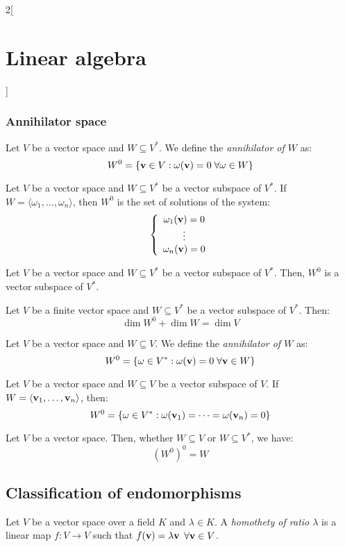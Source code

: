 \documentclass[../../../main.tex]{subfiles}
\begin{document}
\begin{multicols}{2}[\section{Linear algebra}]
  \subsubsection*{Annihilator space}
  \begin{definition}
    Let $V$ be a vector space and $W\subseteq V^*$. We define the \textit{annihilator of $W$} as:
    $$W^0=\{\vb{v}\in V:\omega(\vb{v})=0\;\forall\omega\in W\}$$
  \end{definition}
  \begin{lemma}
    Let $V$ be a vector space and $W\subseteq V^*$ be a vector subspace of $V^*$. If $W=\langle\omega_1,\ldots,\omega_n\rangle$, then $W^0$ is the set of solutions of the system:
    $$\left\{
      \begin{array}{c}
        \omega_1(\vb{v})=0 \\
        \vdots                    \\
        \omega_n(\vb{v})=0
      \end{array}
      \right.$$
  \end{lemma}
  \begin{lemma}
    Let $V$ be a vector space and $W\subseteq V^*$ be a vector subspace of $V^*$. Then, $W^0$ is a vector subspace of $V^*$.
  \end{lemma}
  \begin{theorem}
    Let $V$ be a finite vector space and $W\subseteq V^*$ be a vector subspace of $V^*$. Then: $$\dim W^0+\dim W=\dim V$$
  \end{theorem}
  \begin{definition}
    Let $V$ be a vector space and $W\subseteq V$. We define the \textit{annihilator of $W$} as:
    $$W^0=\{\omega\in V^*:\omega(\vb{v})=0\;\forall\vb{v}\in W\}$$
  \end{definition}
  \begin{lemma}
    Let $V$ be a vector space and $W\subseteq V$  be a vector subspace of $V$. If $W=\langle\vb{v}_1,\ldots,\vb{v}_n\rangle$, then: $$W^0=\{\omega\in V^*:\omega(\vb{v}_1)=\cdots=\omega(\vb{v}_n)=0\}$$
  \end{lemma}
  \begin{prop}
    Let $V$ be a vector space. Then, whether $W\subseteq V$ or $W\subseteq V^*$, we have: $${(W^0)}^0=W$$
  \end{prop}
  \subsection{Classification of endomorphisms}
  \begin{definition}
    Let $V$ be a vector space over a field $K$ and $\lambda\in K$. A \textit{homothety of ratio $\lambda$} is a linear map $f:V\rightarrow V$ such that $f(\vb{v})=\lambda\vb{v}$ $\forall\vb{v}\in V$.
  \end{definition}

\end{multicols}
\end{document}
